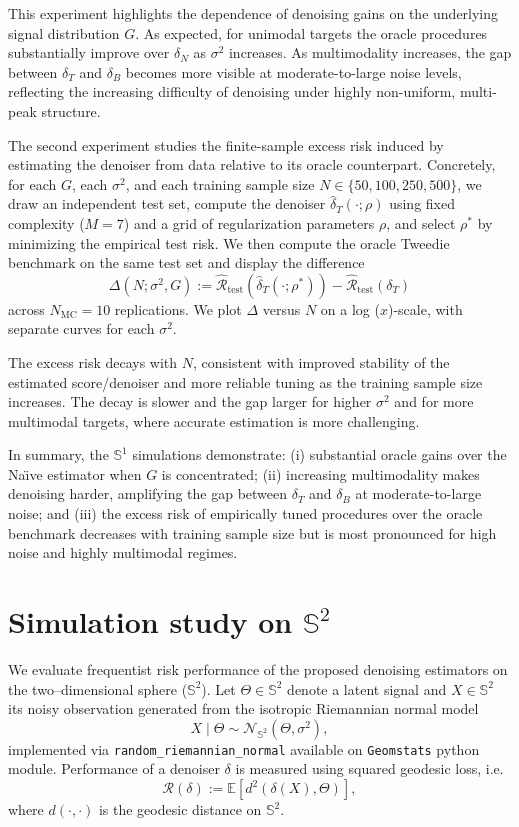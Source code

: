\documentclass{article}
\begin{document}
This experiment highlights the dependence of denoising gains on the underlying signal distribution $G$. As expected, for unimodal targets the oracle procedures substantially improve over $\delta_N$ as $\sigma^2$ increases. As multimodality increases, the gap between $\delta_T$ and $\delta_B$ becomes more visible at moderate-to-large noise levels, reflecting the increasing difficulty of denoising under highly non-uniform, multi-peak structure.

The second experiment studies the finite-sample excess risk induced by estimating the denoiser from data relative to its oracle counterpart. Concretely, for each $G$, each $\sigma^2$, and each training sample size $N \in \{50,100,250,500\}$, we draw an independent test set, compute the denoiser $\hat\delta_T(\cdot;\rho)$ using fixed complexity ($M=7$) and a grid of regularization parameters $\rho$, and select $\rho^*$ by minimizing the empirical test risk. We then compute the oracle Tweedie benchmark on the same test set and display the difference
\[
\Delta(N;\sigma^2,G)
:= \widehat{\mathcal{R}}_{\mathrm{test}}\!\left(\hat\delta_T(\cdot;\rho^*)\right)
- \widehat{\mathcal{R}}_{\mathrm{test}}(\delta_T)
\]
across $N_{\mathrm{MC}}=10$ replications. We plot $\Delta$ versus $N$ on a log ($x$)-scale, with separate curves for each $\sigma^2$.

The excess risk decays with $N$, consistent with improved stability of the estimated score/denoiser and more reliable tuning as the training sample size increases. The decay is slower and the gap larger for higher $\sigma^2$ and for more multimodal targets, where accurate estimation is more challenging.

In summary, the $\mathbb{S}^1$ simulations demonstrate: (i) substantial oracle gains over the Na\"{\i}ve estimator when $G$ is concentrated; (ii) increasing multimodality makes denoising harder, amplifying the gap between $\delta_T$ and $\delta_B$ at moderate-to-large noise; and (iii) the excess risk of empirically tuned procedures over the oracle benchmark decreases with training sample size but is most pronounced for high noise and highly multimodal regimes.


\section*{Simulation study on $\mathbb{S}^2$}
We evaluate frequentist risk performance of the proposed denoising estimators on the two--dimensional sphere ($\mathbb{S}^2$). Let $\Theta \in \mathbb{S}^2$ denote a latent signal and $X \in \mathbb{S}^2$ its noisy observation generated from the isotropic Riemannian normal model
\[
X \mid \Theta \sim \mathcal{N}_{\mathbb{S}^2}\!\left(\Theta,\sigma^2\right),
\]
implemented via \texttt{random\_riemannian\_normal} available on \texttt{Geomstats} python module. Performance of a denoiser $\delta$ is measured using squared geodesic loss, i.e.
\[
\mathcal{R}(\delta) := \mathbb{E}\!\left[d^2\!\left(\delta(X),\Theta\right)\right],
\]
where $d(\cdot,\cdot)$ is the geodesic distance on $\mathbb{S}^2$.
\end{document}
